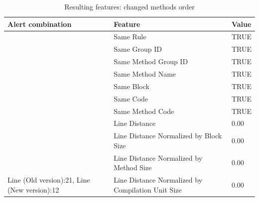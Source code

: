 \documentclass[
]{article}
\begin{document}
\begin{table}[!h]

\caption{\label{tab:unnamed-chunk-22}Resulting features: changed methods order \label{changing_method_order} }
\centering
\begin{tabular}[t]{l|l|l}
\hline
Alert combination & Feature & Value\\
\hline
\rowcolor{gray!6}   & Same Rule & TRUE\\

 & Same Group ID & TRUE\\

\rowcolor{gray!6}   & Same Method Group ID & TRUE\\

 & Same Method Name & TRUE\\

\rowcolor{gray!6}   & Same Block & TRUE\\

 & Same Code & TRUE\\

\rowcolor{gray!6}   & Same Method Code & TRUE\\

 & Line Distance & 0.00\\

\rowcolor{gray!6}   & Line Distance Normalized by Block Size & 0.00\\

 & Line Distance Normalized by Method Size & 0.00\\

\multirow[t]{-11}{*}{\raggedright\arraybackslash Line (Old version):21, Line (New version):12} & Line Distance Normalized by Compilation Unit Size & 0.00\\
\hline
\end{tabular}
\end{table}

\normalsize

\newpage
\end{document}
